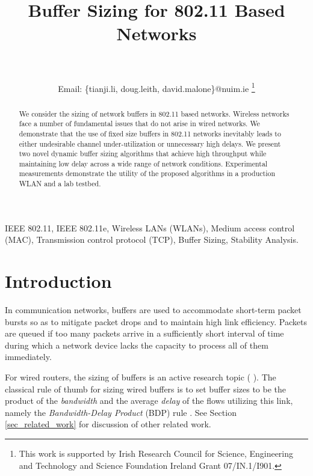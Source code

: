 \documentclass[10pt,twocolumn, journal]{IEEEtran}
\begin{document}
\title{Buffer Sizing for 802.11 Based Networks}
\author{ \\
 \\
Email: {\{tianji.li, doug.leith, david.malone\}}@nuim.ie
\thanks{This work is supported by Irish Research Council for Science, Engineering and Technology and Science Foundation Ireland Grant 07/IN.1/I901.}}
\maketitle




\begin{abstract}
We consider the sizing of network buffers in 802.11 based networks.   Wireless networks
face a number of fundamental issues that  do not arise in wired networks.  We demonstrate
that the use of fixed size buffers in 802.11 networks inevitably leads to either
undesirable channel under-utilization or unnecessary high delays. We present two novel
dynamic buffer sizing algorithms that achieve high throughput while maintaining low delay
across a wide range of network conditions. Experimental measurements demonstrate the
utility of the proposed algorithms in a production WLAN and a lab testbed.
\end{abstract}


\begin{IEEEkeywords}
IEEE 802.11, IEEE 802.11e, Wireless LANs (WLANs), Medium access control (MAC),
Transmission control protocol (TCP), Buffer Sizing, Stability Analysis.
\end{IEEEkeywords}

\section{Introduction}\label{sec_intr}

In communication networks, buffers are used to accommodate short-term packet bursts so as
to mitigate packet drops and to maintain high link efficiency. Packets are queued if too
many packets arrive in a sufficiently short interval of time during which a network
device lacks the capacity to process all of them immediately.

For wired routers, the sizing of buffers is an active research topic
(\cite{Vallamizar_CCR_1994} \cite{Appenzeller_SIGCOMM_2004} \cite{Rade_Letters_2006}
\cite{Vu-Brugier_CCR_2007} \cite{Dhamdhere_ccr_2006}). The classical rule of thumb for
sizing wired buffers is to set buffer sizes to be the product of the \emph{bandwidth} and the average \emph{delay} of the flows utilizing this link, namely
the {\em Bandwidth-Delay Product} (BDP) rule \cite{Vallamizar_CCR_1994}. See Section
\ref{sec_related_work} for discussion of other related work.
\end{document}
